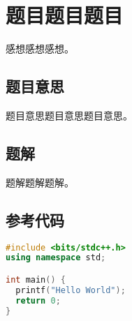 \section{题目题目题目}






感想感想感想。



\subsection{题目意思}
题目意思题目意思题目意思。



\subsection{题解}
题解题解题解。



\subsection{参考代码}
\begin{lstlisting}[language=C++]
#include <bits/stdc++.h>
using namespace std;

int main() {
  printf("Hello World");
  return 0;
}
\end{lstlisting}
